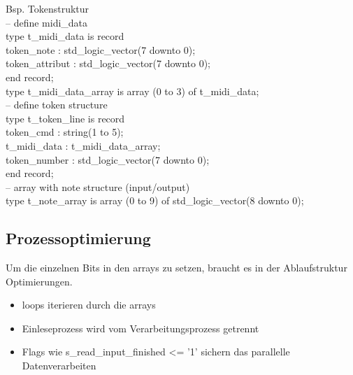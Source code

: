 Bsp. Tokenstruktur  \\  

-- define midi\_data\\
type t\_midi\_data is record  \\                    
\hspace*{12mm}        token\_note : std\_logic\_vector(7 downto 0);  \\                  
\hspace*{12mm}        token\_attribut : std\_logic\_vector(7 downto 0);\\
\hspace*{12mm}    end record;\\

type t\_midi\_data\_array is array (0 to 3) of t\_midi\_data;\\

-- define token structure\\
type t\_token\_line is record\\
\hspace*{12mm}        token\_cmd : string(1 to 5);\\
\hspace*{12mm}        t\_midi\_data : t\_midi\_data\_array;\\
\hspace*{12mm}        token\_number : std\_logic\_vector(7 downto 0);\\
\hspace*{12mm}    end record;\\

       
-- array with note structure (input/output)     \\
type t\_note\_array is array (0 to 9) of std\_logic\_vector(8 downto 0);\\



\subsection{Prozessoptimierung}
Um die einzelnen Bits in den arrays zu setzen, braucht es in der Ablaufstruktur Optimierungen.
\begin{itemize}
	\item loops iterieren durch die arrays
	\item Einleseprozess wird vom Verarbeitungsprozess getrennt
	\item Flags wie s\_read\_input\_finished <= '1' sichern das parallelle Datenverarbeiten
\end{itemize}

